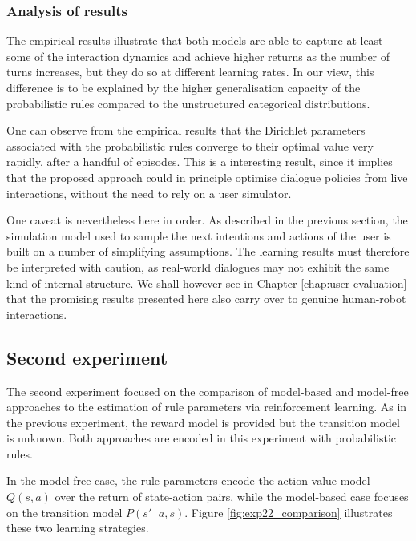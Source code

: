 \subsubsection*{Analysis of results}

The empirical results illustrate that both models are able to capture at least some of the interaction dynamics and achieve higher returns as the number of turns increases, but they do so at different learning rates.  In our view, this difference is to be explained by the higher generalisation capacity of the probabilistic rules compared to the unstructured categorical distributions.  

One can observe from the empirical results that the Dirichlet parameters associated with the probabilistic rules converge to their optimal value very rapidly, after a handful of episodes.  This is a interesting result, since it implies that the proposed approach could in principle optimise dialogue policies from live interactions, without the need to rely on a user simulator.

One caveat is nevertheless here in order.  As described in the previous section, the simulation model used to sample the next intentions and actions of the user is built on a number of simplifying assumptions.  The learning results must therefore be interpreted with caution, as real-world dialogues may not exhibit the same kind of internal structure.  We shall however see in Chapter \ref{chap:user-evaluation} that the promising results presented here also carry over to genuine human-robot interactions. 

\subsection{Second experiment}

The second experiment focused on the comparison of model-based and model-free approaches to the estimation of rule parameters via reinforcement learning.   As in the previous experiment, the reward model is provided but the transition model is unknown.  Both approaches are encoded in this experiment with probabilistic rules.

In the model-free case, the rule parameters encode the action-value model $Q(s,a)$ over the return of state-action pairs, while the model-based case focuses on the transition model $P(s'\, | \, a,s)$.  Figure \ref{fig:exp22_comparison} illustrates these two learning strategies.  

